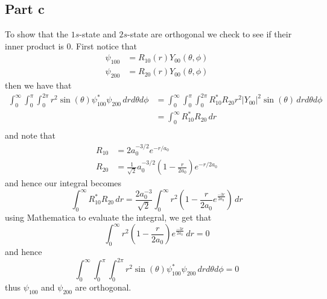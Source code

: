 \documentclass[12pt]{report}
\begin{document}
\subsection*{Part c}
To show that the $1s$-state and $2s$-state are orthogonal we check to see if their inner product is $0$. First notice that
\begin{align*}
  \psi_{100} &= R_{10}(r)Y_{00}(\theta,\phi) \\
  \psi_{200} &= R_{20}(r)Y_{00}(\theta,\phi)
\end{align*}
then we have that
\begin{align*}
  \int_0^\infty \int_0^\pi \int_0^{2\pi} r^2 \sin(\theta) \psi_{100}^* \psi_{200} \, dr d\theta d\phi &= \int_0^\infty \int_0^\pi \int_0^{2\pi} R_{10}^* R_{20} r^2 |Y_{00}|^2 \sin(\theta) \, dr d\theta d\phi \\  
                                                                                                      &= \int_0^\infty R_{10}^* R_{20} \, dr\\
\end{align*}
and note that
\begin{align*}
  R_{10} &= 2a_0^{-3/2} e^{-r/a_0} \\ 
  R_{20} &= \frac{1}{\sqrt{2}} a_0^{-3/2} \left(1 - \frac{r}{2a_0}\right) e^{-r/2a_0}
\end{align*}
and hence our integral becomes
\begin{equation*}
  \int_0^\infty R_{10}^* R_{20} \, dr = \frac{2a_0^{-3}}{\sqrt{2}}\int_0^\infty r^2\left(1 - \frac{r}{2a_0} e^{\frac{-3r}{2a_0}}\right) \, dr  
\end{equation*}
using Mathematica to evaluate the integral, we get that
\begin{equation*}
  \int_0^\infty r^2\left(1 - \frac{r}{2a_0}\right) e^{\frac{-3r}{2a_0}} \, dr  = 0
\end{equation*}
and hence
\begin{equation*}
  \int_0^\infty \int_0^\pi \int_0^{2\pi} r^2 \sin(\theta) \psi_{100}^* \psi_{200} \, dr d\theta d\phi = 0
\end{equation*}
thus $\psi_{100}$ and $\psi_{200}$ are orthogonal.
\end{document}
